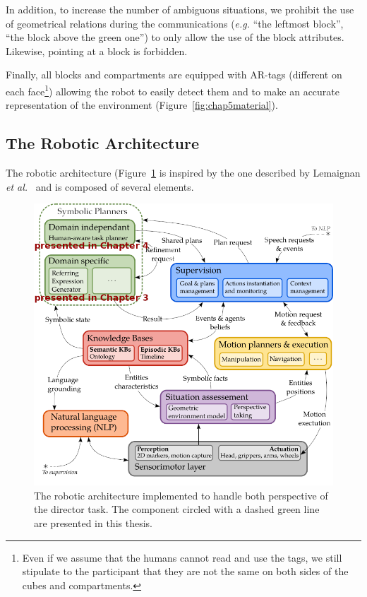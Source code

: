 \documentclass[a4paper,11pt,twoside]{StyleThese}
\begin{document}
In addition, to increase the number of ambiguous situations, we prohibit the use of geometrical relations during the communications (\textit{e.g.} ``the leftmost block'', ``the block above the green one'') to only allow the use of the block attributes. Likewise, pointing at a block is forbidden.

Finally, all blocks and compartments are equipped with AR-tags (different on each face\footnote{Even if we assume that the humans cannot read and use the tags, we still stipulate to the participant that they are not the same on both sides of the cubes and compartments.}) allowing the robot to easily detect them and to make an accurate representation of the environment (Figure~\ref{fig:chap5material}).

\subsection{The Robotic Architecture}
The robotic architecture (Figure~\ref{fig:chap5dtarchi} is inspired by the one described by Lemaignan \textit{et al.}~\cite{lemaignan2017artificial} and is composed of several elements.

\begin{figure}[hbtp]
\centering
\includegraphics[width=\textwidth]{figures/chapter5/architecture.png}
\caption{The robotic architecture implemented to handle both perspective of the director task. The component circled with a dashed green line are presented in this thesis.}
\label{fig:chap5dtarchi}
\end{figure}
\end{document}
